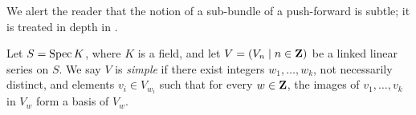 \begin{remark}
We alert the reader that the notion of a sub-bundle of a push-forward is subtle; it is treated in depth in \cite[Definition~B.2.1]{oss:14}.
\end{remark}



\begin{definition}
  \label{def:simple_lls}
Let $S = \operatorname{Spec} K$, where $K$ is a field, and let $V = (V_n \mid n \in {\bf Z})$ be a linked linear series on $S$.
We say  $V$ is \emph{simple} if there exist integers $w_1, \dots, w_k$, not necessarily distinct, and elements $v_i \in V_{w_i}$ such that for every $w \in {\bf Z}$, the images of $v_1, \dots, v_k$ in $V_w$ form a basis of $V_w$.
\end{definition}

